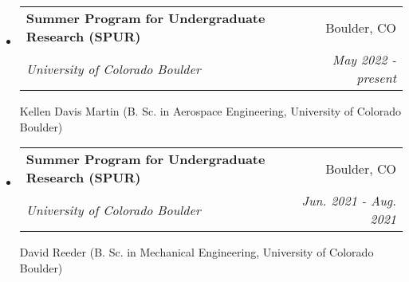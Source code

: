 \documentclass[letterpaper,11pt]{article}
\makeatletter
\newcommand{\resumeSubheading}[4]{
  \vspace{-1pt}\item
    \begin{tabular*}{0.97\textwidth}{l@{\extracolsep{\fill}}r}
      \textbf{#1} & #2 \\
      \textit{\small#3} & \textit{\small #4} \\
    \end{tabular*}\vspace{-5pt}
}
\newcommand{\resumeSubHeadingListStart}{\begin{itemize}[leftmargin=*]}
\newcommand{\resumeSubHeadingListEnd}{\end{itemize}}
\makeatother
\begin{document}
\resumeSubHeadingListStart

  \resumeSubheading
    {Summer Program for Undergraduate Research (SPUR)}{Boulder, CO}
    {University of Colorado Boulder}{May 2022 - present}
    \vspace{.1 mm}

    Kellen Davis Martin (B. Sc. in Aerospace Engineering, University of Colorado Boulder)

  \resumeSubheading
    {Summer Program for Undergraduate Research (SPUR)}{Boulder, CO}
    {University of Colorado Boulder}{Jun. 2021 - Aug. 2021}
    \vspace{.1 mm}

    David Reeder (B. Sc. in Mechanical Engineering, University of Colorado Boulder)

\resumeSubHeadingListEnd

\end{document}
